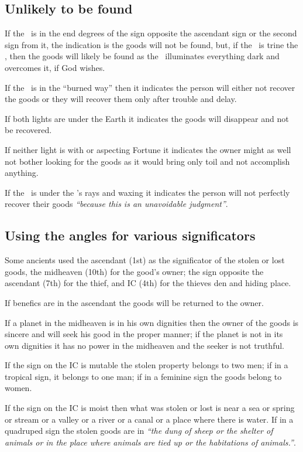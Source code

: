 \subsection{Unlikely to be found}

If the \Moon\, is in the end degrees of the sign opposite the ascendant sign or the second sign from it, the indication is the goods will not be found, but, if the \Sun\, is trine the \Moon, then the goods will likely be found as the \Sun\, illuminates everything dark and overcomes it, if God wishes.

If the \Moon\, is in the ``burned way'' then it indicates the person will either not recover the goods or they will recover them only after trouble and delay.

If both lights are under the Earth it indicates the goods will disappear and not be recovered.

If neither light is with or aspecting Fortune it indicates the owner might as well not bother looking for the goods as it would bring only toil and not accomplish anything.

If the \Moon\, is under the \Sun's rays and waxing it indicates the person will not perfectly recover their goods \textsl{``because this is an unavoidable judgment''}.

\subsection{Using the angles for various significators}
Some ancients used the ascendant (1st) as the significator of the stolen or lost goods, the midheaven (10th) for the good's owner; the sign opposite the ascendant (7th) for the thief, and IC (4th) for the thieves den and hiding place.

If benefics are in the ascendant the goods will be returned to the owner.

If a planet in the midheaven is in his own dignities then the owner of the goods is sincere and will seek his good in the proper manner; if the planet is not in its own dignities it has no power in the midheaven and the seeker is not truthful.

If the sign on the IC is mutable the stolen property belongs to two men; if in a tropical sign, it belongs to one man; if in a feminine sign the goods belong to women.

If the sign on the IC is moist then what was stolen or lost is near a sea or spring or stream or a valley or a river or a canal or a place where there is water. If in a quadruped sign the stolen goods are in \textsl{``the dung of sheep or the shelter of animals or in the place where animals are tied up or the habitations of animals.''}.
	
